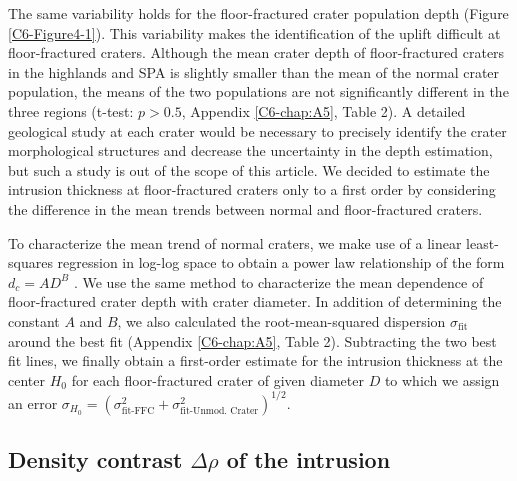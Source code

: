 The same  variability holds for the  floor-fractured crater population
depth   (Figure   \ref{C6-Figure4-1}).    This  variability   makes   the
identification   of   the    uplift   difficult   at   floor-fractured
craters. Although the mean crater  depth of floor-fractured craters in
the highlands and SPA is slightly  smaller than the mean of the normal
crater  population,  the   means  of  the  two   populations  are  not
significantly  different  in  the  three regions  (t-test:  $p>  0.5$,
Appendix \ref{C6-chap:A5}, Table 2).  A detailed geological study at each
crater   would  be   necessary  to   precisely  identify   the  crater
morphological  structures and  decrease the  uncertainty in  the depth
estimation, but such a study is out  of the scope of this article.  We
decided to estimate the intrusion thickness at floor-fractured craters
only to a first order by considering the difference in the mean trends
between normal and floor-fractured craters.

To characterize  the mean trend  of normal craters,  we make use  of a
linear least-squares regression in log-log space to obtain a power law
relationship of the form $d_c=AD^B$ \citep{Pike:1974ux,Kalynn:2013fg}.
We  use  the  same  method  to characterize  the  mean  dependence  of
floor-fractured  crater depth  with crater  diameter.  In  addition of
determining  the  constant  $A$  and   $B$,  we  also  calculated  the
root-mean-squared dispersion $\sigma_{\text{fit}}$ around the best fit
(Appendix  \ref{C6-chap:A5},  Table 2).   Subtracting  the  two best  fit
lines,  we finally  obtain a  first-order estimate  for the  intrusion
thickness at the center $H_0$ for each floor-fractured crater of given
diameter     $D$      to     which     we     assign      an     error
$\sigma_{H_0}
=(\sigma_{\text{fit-FFC}}^2+\sigma_{\text{fit-Unmod. Crater}}^2)^{1/2}$.

\subsection{Density contrast $\Delta \rho$ of the intrusion}
\label{C6-sec:intr-dens-contr}

